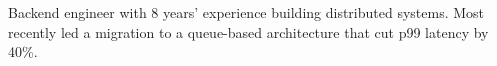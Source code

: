 \documentclass[11pt, a4paper]{resume}
\begin{document}
\makecvheader

\begin{cvsummary}
    Backend engineer with 8 years' experience building distributed
    systems. Most recently led a migration to a queue-based architecture
    that cut p99 latency by 40\%.
\end{cvsummary}

\newlength{\headersmargin}
\newlength{\columnsmargin}

\setlength{\headersmargin}{3.6cm}
\setlength{\leftcolumnwidth}{5cm}
\setlength{\columnsmargin}{0.5\sidemargin}
\setlength{\timelinemargin}{0.5cm}

\end{document}
